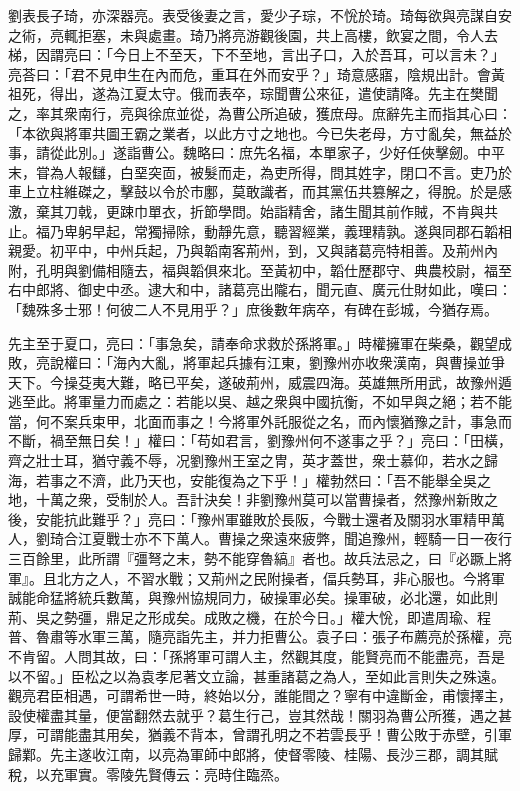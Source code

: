 \begin{pinyinscope}
劉表長子琦，亦深器亮。表受後妻之言，愛少子琮，不恱於琦。琦每欲與亮謀自安之術，亮輒拒塞，未與處畫。琦乃將亮游觀後園，共上高樓，飲宴之間，令人去梯，因謂亮曰：「今日上不至天，下不至地，言出子口，入於吾耳，可以言未？」亮荅曰：「君不見申生在內而危，重耳在外而安乎？」琦意感寤，陰規出計。會黃祖死，得出，遂為江夏太守。俄而表卒，琮聞曹公來征，遣使請降。先主在樊聞之，率其衆南行，亮與徐庶並從，為曹公所追破，獲庶母。庶辭先主而指其心曰：「本欲與將軍共圖王霸之業者，以此方寸之地也。今已失老母，方寸亂矣，無益於事，請從此別。」遂詣曹公。魏略曰：庶先名福，本單家子，少好任俠擊劒。中平末，甞為人報讎，白堊突靣，被髮而走，為吏所得，問其姓字，閉口不言。吏乃於車上立柱維磔之，擊鼓以令於市鄽，莫敢識者，而其黨伍共篡解之，得脫。於是感激，棄其刀戟，更踈巾單衣，折節學問。始詣精舍，諸生聞其前作賊，不肯與共止。福乃卑躬早起，常獨掃除，動靜先意，聽習經業，義理精孰。遂與同郡石韜相親愛。初平中，中州兵起，乃與韜南客荊州，到，又與諸葛亮特相善。及荊州內附，孔明與劉備相隨去，福與韜俱來北。至黃初中，韜仕歷郡守、典農校尉，福至右中郎將、御史中丞。逮大和中，諸葛亮出隴右，聞元直、廣元仕財如此，嘆曰：「魏殊多士邪！何彼二人不見用乎？」庶後數年病卒，有碑在彭城，今猶存焉。

先主至于夏口，亮曰：「事急矣，請奉命求救於孫將軍。」時權擁軍在柴桑，觀望成敗，亮說權曰：「海內大亂，將軍起兵據有江東，劉豫州亦收衆漢南，與曹操並爭天下。今操芟夷大難，略已平矣，遂破荊州，威震四海。英雄無所用武，故豫州遁逃至此。將軍量力而處之：若能以吳、越之衆與中國抗衡，不如早與之絕；若不能當，何不案兵束甲，北面而事之！今將軍外託服從之名，而內懷猶豫之計，事急而不斷，禍至無日矣！」權曰：「苟如君言，劉豫州何不遂事之乎？」亮曰：「田橫，齊之壯士耳，猶守義不辱，况劉豫州王室之冑，英才蓋世，衆士慕仰，若水之歸海，若事之不濟，此乃天也，安能復為之下乎！」權勃然曰：「吾不能舉全吳之地，十萬之衆，受制於人。吾計決矣！非劉豫州莫可以當曹操者，然豫州新敗之後，安能抗此難乎？」亮曰：「豫州軍雖敗於長阪，今戰士還者及關羽水軍精甲萬人，劉琦合江夏戰士亦不下萬人。曹操之衆遠來疲弊，聞追豫州，輕騎一日一夜行三百餘里，此所謂『彊弩之末，勢不能穿魯縞』者也。故兵法忌之，曰『必蹶上將軍』。且北方之人，不習水戰；又荊州之民附操者，偪兵勢耳，非心服也。今將軍誠能命猛將統兵數萬，與豫州協規同力，破操軍必矣。操軍破，必北還，如此則荊、吳之勢彊，鼎足之形成矣。成敗之機，在於今日。」權大恱，即遣周瑜、程普、魯肅等水軍三萬，隨亮詣先主，并力拒曹公。袁子曰：張子布薦亮於孫權，亮不肯留。人問其故，曰：「孫將軍可謂人主，然觀其度，能賢亮而不能盡亮，吾是以不留。」臣松之以為袁孝尼著文立論，甚重諸葛之為人，至如此言則失之殊遠。觀亮君臣相遇，可謂希世一時，終始以分，誰能間之？寧有中違斷金，甫懷擇主，設使權盡其量，便當翻然去就乎？葛生行己，豈其然哉！關羽為曹公所獲，遇之甚厚，可謂能盡其用矣，猶義不背本，曾謂孔明之不若雲長乎！曹公敗于赤壁，引軍歸鄴。先主遂收江南，以亮為軍師中郎將，使督零陵、桂陽、長沙三郡，調其賦稅，以充軍實。零陵先賢傳云：亮時住臨烝。


\end{pinyinscope}
